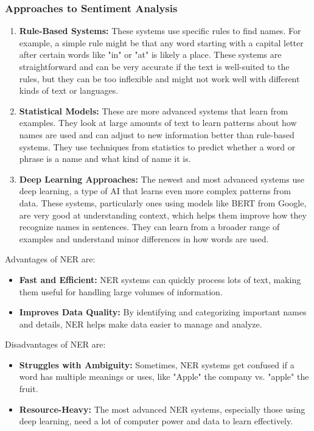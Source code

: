 \subsubsection{Approaches to Sentiment Analysis}
\begin{enumerate}
    \item \textbf{Rule-Based Systems:} These systems use specific rules to find names. For example, a simple rule might be that any word starting with a capital letter after certain words like "in" or "at" is likely a place. These systems are straightforward and can be very accurate if the text is well-suited to the rules, but they can be too inflexible and might not work well with different kinds of text or languages.
    \item \textbf{Statistical Models:} These are more advanced systems that learn from examples. They look at large amounts of text to learn patterns about how names are used and can adjust to new information better than rule-based systems. They use techniques from statistics to predict whether a word or phrase is a name and what kind of name it is.
    \item \textbf{Deep Learning Approaches:} The newest and most advanced systems use deep learning, a type of AI that learns even more complex patterns from data. These systems, particularly ones using models like BERT from Google, are very good at understanding context, which helps them improve how they recognize names in sentences. They can learn from a broader range of examples and understand minor differences in how words are used.
\end{enumerate}

Advantages of NER are: 
\begin{itemize}
    \item \textbf{Fast and Efficient:} NER systems can quickly process lots of text, making them useful for handling large volumes of information.
    \item \textbf{Improves Data Quality:} By identifying and categorizing important names and details, NER helps make data easier to manage and analyze.
\end{itemize}

Disadvantages of NER are: 
\begin{itemize}
    \item \textbf{Struggles with Ambiguity:} Sometimes, NER systems get confused if a word has multiple meanings or uses, like "Apple" the company vs. "apple" the fruit.
    \item \textbf{Resource-Heavy:} The most advanced NER systems, especially those using deep learning, need a lot of computer power and data to learn effectively.
\end{itemize}

